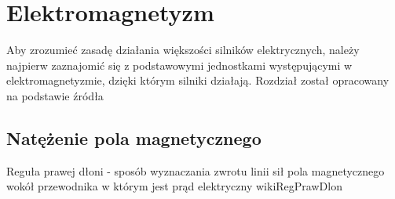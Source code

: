 \section{Elektromagnetyzm}

Aby zrozumieć zasadę działania większości silników elektrycznych, należy najpierw zaznajomić się z podstawowymi jednostkami występującymi w elektromagnetyzmie, dzięki którym silniki działają. Rozdział został opracowany na podstawie źródła \cite{jaszczuk}

\subsection{Natężenie pola magnetycznego}

	   {Reguła prawej dłoni - sposób wyznaczania zwrotu linii sił pola magnetycznego wokół przewodnika w którym jest prąd elektryczny}
	   {wikiRegPrawDlon}






